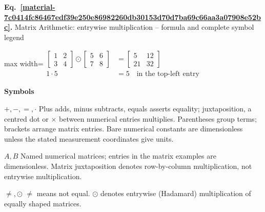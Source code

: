 \documentclass[11pt,a4paper]{article}
\begin{document}
\par\medskip
\noindent\begin{minipage}{\linewidth}
\label{material-7c0414fc86467edf39e250e86982260db30153d70d7ba69c66aa3a07908e52bc}
\noindent\textbf{Eq.~\ref*{material-7c0414fc86467edf39e250e86982260db30153d70d7ba69c66aa3a07908e52bc}.} Matrix Arithmetic: entrywise multiplication – formula and complete symbol legend\par\nopagebreak
\begin{center}\begin{adjustbox}{max width=\linewidth}$\displaystyle \begin{aligned}\begin{bmatrix}1&2\\3&4\end{bmatrix}\odot \begin{bmatrix}5&6\\7&8\end{bmatrix}&=\begin{bmatrix}\boxed{5}&12\\21&32\end{bmatrix}\\1\cdot5&=\boxed{5}\quad\text{in the top-left entry}\end{aligned}$\end{adjustbox}\end{center}

\par\noindent\textbf{Symbols}

\par\noindent\textbf{\(+,-,=,\cdot\)} Plus adds, minus subtracts, equals asserts equality; juxtaposition, a centred dot or \ensuremath{\times} between numerical entries multiplies. Parentheses group terms; brackets arrange matrix entries. Bare numerical constants are dimensionless unless the stated measurement coordinates give units.

\par\noindent\textbf{\(A,B\)} Named numerical matrices; entries in the matrix examples are dimensionless. Matrix juxtaposition denotes row-by-column multiplication, not entrywise multiplication.

\par\noindent\textbf{\(\ne,\odot\)} \ensuremath{\ne} means not equal. \ensuremath{\odot} denotes entrywise (Hadamard) multiplication of equally shaped matrices.

\end{minipage}\par
\medskip
\end{document}
